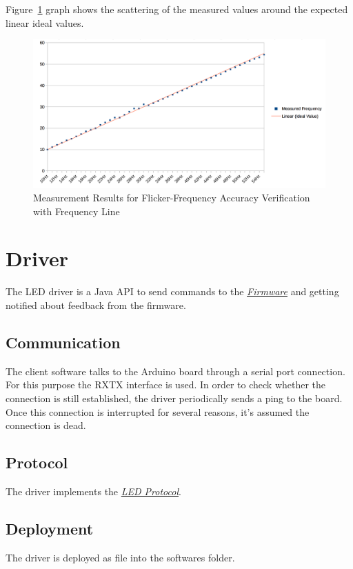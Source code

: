 Figure~\ref{fig:firmware-verification} graph shows the scattering of the measured values around the expected linear ideal values.

\begin{figure}[H]
	\centering
	\includegraphics[width=\textwidth]{images/firmware-verification.png}
	\caption{Measurement Results for Flicker-Frequency Accuracy Verification with Frequency Line}
	\label{fig:firmware-verification}
\end{figure}


\chapter{Driver}
\label{source/driver:driver}\label{source/driver::doc}
The LED driver is a Java API to send commands to the {\hyperref[source/firmware::doc]{\emph{\emph{Firmware}}}} and getting notified about feedback from the firmware.


\section{Communication}
\label{source/driver:communication}
The client software talks to the Arduino board through a serial port connection. For this purpose the RXTX interface is used. In order to check whether the connection is still established, the driver periodically sends a ping to the board. Once this connection is interrupted for several reasons, it's assumed the connection is dead.


\section{Protocol}
\label{source/driver:protocol}
The driver implements the {\hyperref[appendix/led-protocol::doc]{\emph{\emph{LED Protocol}}}}.


\section{Deployment}
\label{source/driver:deployment}
The driver is deployed as  file into the softwares  folder.

